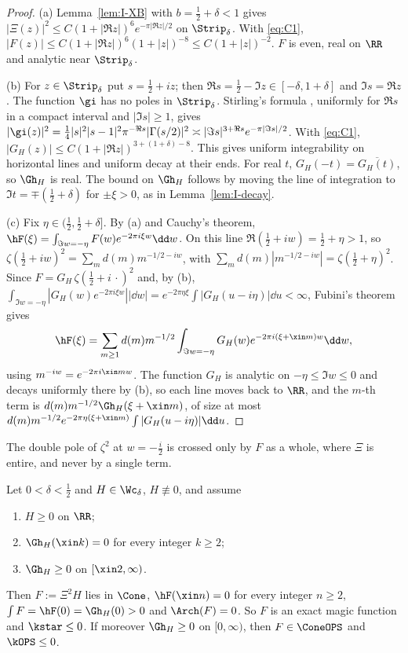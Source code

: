 \begin{proof}
(a) Lemma~\ref{lem:I-XB} with $b=\frac12+\delta<1$ gives $|\Xi(z)|^2\le C(1+|\Re z|)^6e^{-\pi|\Re z|/2}$ on $\Strip_\delta$. With
\eqref{eq:C1}, $|F(z)|\le C(1+|\Re z|)^6(1+|z|)^{-8}\le C(1+|z|)^{-2}$. $F$ is even, real on $\RR$ and analytic near $\Strip_\delta$.

(b) For $z\in \Strip_\delta$ put $s=\frac12+iz$; then $\Re s=\frac12-\Im z\in[-\delta,1+\delta]$ and $\Im s=\Re z$. The function $\gi$ has no
poles in $\Strip_\delta$. Stirling's formula \cite[5.11.9]{DLMF}, uniformly for $\Re s$ in a compact interval and $|\Im s|\ge1$, gives
$|\gi(z)|^2=\frac14|s|^2|s-1|^2\pi^{-\Re s}|\Gamma(s/2)|^2\asymp|\Im s|^{3+\Re s}e^{-\pi|\Im s|/2}$. With \eqref{eq:C1},
$|G_H(z)|\le C(1+|\Re z|)^{3+(1+\delta)-8}$. This gives uniform integrability on horizontal lines and uniform decay at their ends. For real
$t$, $G_H(-t)=\overline{G_H(t)}$, so $\Gh_H$ is real. The bound on $\Gh_H$ follows by moving the line of integration to $\Im t=\mp(\frac12+\delta)$
for $\pm\xi>0$, as in Lemma~\ref{lem:I-decay}.

(c) Fix $\eta\in(\frac12,\frac12+\delta]$. By (a) and Cauchy's theorem, $\hF(\xi)=\int_{\Im w=-\eta}F(w)e^{-2\pi i\xi w}\dd w$. On this line
$\Re(\frac12+iw)=\frac12+\eta>1$, so $\zeta(\frac12+iw)^2=\sum_md(m)m^{-1/2-iw}$, with $\sum_md(m)|m^{-1/2-iw}|=\zeta(\frac12+\eta)^2$. Since
$F=G_H\,\zeta(\frac12+i\,\cdot)^2$ and, by (b), $\int_{\Im w=-\eta}|G_H(w)e^{-2\pi i\xi w}||\dd w|=e^{-2\pi\eta\xi}\int|G_H(u-i\eta)|\dd u<\infty$,
Fubini's theorem gives
\[
\hF(\xi)=\sum_{m\ge1}d(m)m^{-1/2}\int_{\Im w=-\eta}G_H(w)e^{-2\pi i(\xi+\xin m)w}\dd w ,
\]
using $m^{-iw}=e^{-2\pi i\xin mw}$. The function $G_H$ is analytic on $-\eta\le\Im w\le0$ and decays uniformly there by (b), so each line moves
back to $\RR$, and the $m$-th term is $d(m)m^{-1/2}\Gh_H(\xi+\xin m)$, of size at most
$d(m)m^{-1/2}e^{-2\pi\eta(\xi+\xin m)}\int|G_H(u-i\eta)|\dd u$.
\end{proof}

The double pole of $\zeta^2$ at $w=-\frac i2$ is crossed only by $F$ as a whole, where $\Xi$ is entire, and never by a single term.

\begin{proposition}\label{prop:reduction}
Let $0<\delta<\frac12$ and $H\in\Wc_\delta$, $H\not\equiv0$, and assume
\begin{enumerate}[label=\textup{(C\arabic*)},start=2]
\item $H\ge0$ on $\RR$;
\item $\Gh_H(\xin k)=0$ for every integer $k\ge2$;
\item $\Gh_H\ge0$ on $[\xin2,\infty)$.
\end{enumerate}
Then $F:=\Xi^2H$ lies in $\Cone$, $\hF(\xin n)=0$ for every integer $n\ge2$, $\int F=\hF(0)=\Gh_H(0)>0$ and $\Arch(F)=0$. So $F$ is an exact
magic function and $\kstar\le0$. If moreover $\Gh_H\ge0$ on $[0,\infty)$, then $F\in\ConeOPS$ and $\kOPS\le0$.
\end{proposition}

